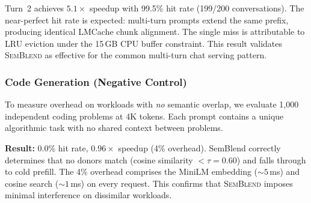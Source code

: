 \documentclass[10pt,twocolumn]{article}
\newcommand{\semblend}{\textsc{SemBlend}\xspace}
\begin{document}
Turn~2 achieves $\mathbf{5.1\times}$ speedup with 99.5\% hit rate
(199/200 conversations). The near-perfect hit rate is expected:
multi-turn prompts extend the same prefix, producing identical
LMCache chunk alignment. The single miss is attributable to LRU
eviction under the 15\,GB CPU buffer constraint. This result
validates \semblend as effective for the common multi-turn chat
serving pattern.

\subsubsection{Code Generation (Negative Control)}
\label{sec:codegen}

To measure overhead on workloads with \emph{no} semantic overlap,
we evaluate 1,000 independent coding problems at 4K tokens.
Each prompt contains a unique algorithmic task with no shared
context between problems.

\textbf{Result:} 0.0\% hit rate, $0.96\times$ speedup (4\% overhead).
SemBlend correctly determines that no donors match (cosine similarity
$< \tau{=}0.60$) and falls through to cold prefill. The 4\% overhead
comprises the MiniLM embedding (${\sim}5$\,ms) and cosine search
(${\sim}1$\,ms) on every request. This confirms that \semblend
imposes minimal interference on dissimilar workloads.
\end{document}
